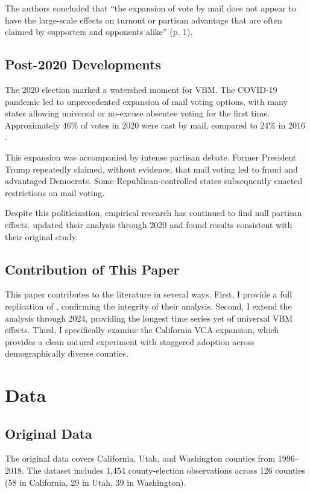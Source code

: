 \documentclass[12pt]{article}
\begin{document}
The authors concluded that ``the expansion of vote by mail does not appear to have the large-scale effects on turnout or partisan advantage that are often claimed by supporters and opponents alike'' (p. 1).

\subsection{Post-2020 Developments}

The 2020 election marked a watershed moment for VBM. The COVID-19 pandemic led to unprecedented expansion of mail voting options, with many states allowing universal or no-excuse absentee voting for the first time. Approximately 46\% of votes in 2020 were cast by mail, compared to 24\% in 2016 \citep{census2020voting}.

This expansion was accompanied by intense partisan debate. Former President Trump repeatedly claimed, without evidence, that mail voting led to fraud and advantaged Democrats. Some Republican-controlled states subsequently enacted restrictions on mail voting.

Despite this politicization, empirical research has continued to find null partisan effects. \citet{thompson2022voting} updated their analysis through 2020 and found results consistent with their original study.

\subsection{Contribution of This Paper}

This paper contributes to the literature in several ways. First, I provide a full replication of \citet{thompson2020universal}, confirming the integrity of their analysis. Second, I extend the analysis through 2024, providing the longest time series yet of universal VBM effects. Third, I specifically examine the California VCA expansion, which provides a clean natural experiment with staggered adoption across demographically diverse counties.

\section{Data}

\subsection{Original Data}

The original \citet{thompson2020universal} data covers California, Utah, and Washington counties from 1996--2018. The dataset includes 1,454 county-election observations across 126 counties (58 in California, 29 in Utah, 39 in Washington).
\end{document}
